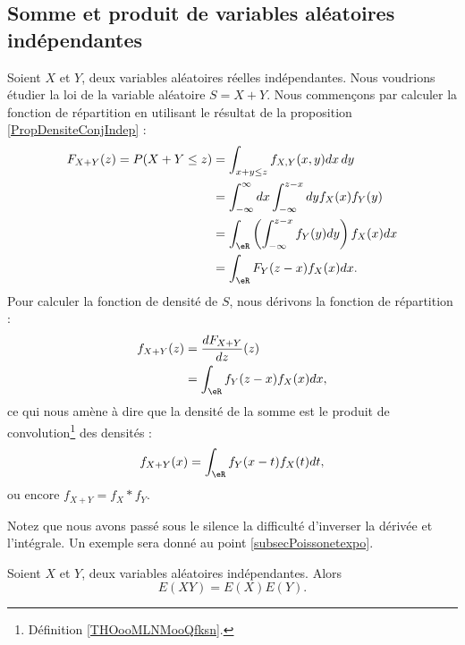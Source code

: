 \subsection{Somme et produit de variables aléatoires indépendantes}
\label{subsecscnvommevariablsindep}


Soient \( X\) et \( Y\), deux variables aléatoires réelles indépendantes. Nous voudrions étudier la loi de la variable aléatoire \( S=X+Y\). Nous commençons par calculer la fonction de répartition en utilisant le résultat de la proposition \ref{PropDensiteConjIndep} :
\begin{subequations}
    \begin{align}
        F_{X+Y}(z)=P(X+Y\leq z)&=\int_{x+y\leq z}f_{X,Y}(x,y)dx\,dy\\
        &=\int_{-\infty}^{\infty}dx\int_{-\infty}^{z-x}dyf_X(x)f_Y(y)\\
        &=\int_{\eR}\left( \int_{-\infty}^{z-x}f_Y(y)dy \right)f_X(x)dx\\
        &=\int_{\eR}F_Y(z-x)f_X(x)dx.
    \end{align}
\end{subequations}
Pour calculer la fonction de densité de \( S\), nous dérivons la fonction de répartition :
\begin{subequations}
    \begin{align}
        f_{X+Y}(z)&=\frac{ d F_{X+Y} }{ d z }(z)\\
        &=\int_{\eR}f_Y(z-x)f_X(x)dx,
    \end{align}
\end{subequations}
ce qui nous amène à dire que la densité de la somme est le produit de convolution\footnote{Définition \ref{THOooMLNMooQfksn}.} des densités :
\begin{equation}        \label{EqdensitesooemXYint}
    f_{X+Y}(x)=\int_{\eR}f_Y(x-t)f_X(t)dt,
\end{equation}
ou encore \( f_{X+Y}=f_X* f_Y\).

Notez que nous avons passé sous le silence la difficulté d'inverser la dérivée et l'intégrale. Un exemple sera donné au point \ref{subsecPoissonetexpo}.

\begin{lemma}       \label{LemEXYEXEYprodindep}
    Soient \( X\) et \( Y\), deux variables aléatoires indépendantes. Alors
    \begin{equation}
        E(XY)=E(X)E(Y).
    \end{equation}
\end{lemma}

